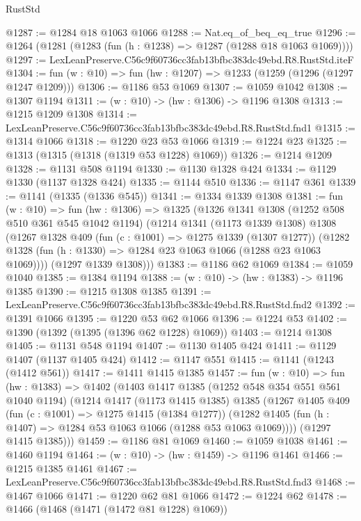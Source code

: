 \begin{lexlean}{RustStd}
\begin{coremodule}
@1287 := @1284 @18 @1063 @1066
@1288 := Nat.eq_of_beq_eq_true
@1296 := @1264 (@1281 (@1283 (fun (h : @1238) => @1287 (@1288 @18 @1063 @1069))))
@1297 := LexLeanPreserve.C56c9f60736cc3fab13bfbc383dc49ebd.R8.RustStd.iteF
@1304 := fun (w : @10) => fun (hw : @1207) => @1233 (@1259 (@1296 (@1297 @1247 @1209)))
@1306 := @1186 @53 @1069
@1307 := @1059 @1042
@1308 := @1307 @1194
@1311 := (w : @10) -> (hw : @1306) -> @1196 @1308
@1313 := @1215 @1209 @1308
@1314 := LexLeanPreserve.C56c9f60736cc3fab13bfbc383dc49ebd.R8.RustStd.fnd1
@1315 := @1314 @1066
@1318 := @1220 @23 @53 @1066
@1319 := @1224 @23
@1325 := @1313 (@1315 (@1318 (@1319 @53 @1228) @1069))
@1326 := @1214 @1209
@1328 := @1131 @508 @1194
@1330 := @1130 @1328 @424
@1334 := @1129 @1330 (@1137 @1328 @424)
@1335 := @1144 @510
@1336 := @1147 @361
@1339 := @1141 (@1335 (@1336 @545))
@1341 := @1334 @1339 @1308
@1381 := fun (w : @10) =>
  fun (hw : @1306) =>
  @1325
    (@1326
      @1341
      @1308
      (@1252 @508 @510 @361 @545 @1042 @1194)
      (@1214
        @1341
        (@1173 @1339 @1308)
        @1308
        (@1267
          @1328
          @409
          (fun (c : @1001) => @1275 @1339 (@1307 @1277))
          (@1282 @1328 (fun (h : @1330) => @1284 @23 @1063 @1066 (@1288 @23 @1063 @1069))))
        (@1297 @1339 @1308)))
@1383 := @1186 @62 @1069
@1384 := @1059 @1040
@1385 := @1384 @1194
@1388 := (w : @10) -> (hw : @1383) -> @1196 @1385
@1390 := @1215 @1308 @1385
@1391 := LexLeanPreserve.C56c9f60736cc3fab13bfbc383dc49ebd.R8.RustStd.fnd2
@1392 := @1391 @1066
@1395 := @1220 @53 @62 @1066
@1396 := @1224 @53
@1402 := @1390 (@1392 (@1395 (@1396 @62 @1228) @1069))
@1403 := @1214 @1308
@1405 := @1131 @548 @1194
@1407 := @1130 @1405 @424
@1411 := @1129 @1407 (@1137 @1405 @424)
@1412 := @1147 @551
@1415 := @1141 (@1243 (@1412 @561))
@1417 := @1411 @1415 @1385
@1457 := fun (w : @10) =>
  fun (hw : @1383) =>
  @1402
    (@1403
      @1417
      @1385
      (@1252 @548 @354 @551 @561 @1040 @1194)
      (@1214
        @1417
        (@1173 @1415 @1385)
        @1385
        (@1267
          @1405
          @409
          (fun (c : @1001) => @1275 @1415 (@1384 @1277))
          (@1282 @1405 (fun (h : @1407) => @1284 @53 @1063 @1066 (@1288 @53 @1063 @1069))))
        (@1297 @1415 @1385)))
@1459 := @1186 @81 @1069
@1460 := @1059 @1038
@1461 := @1460 @1194
@1464 := (w : @10) -> (hw : @1459) -> @1196 @1461
@1466 := @1215 @1385 @1461
@1467 := LexLeanPreserve.C56c9f60736cc3fab13bfbc383dc49ebd.R8.RustStd.fnd3
@1468 := @1467 @1066
@1471 := @1220 @62 @81 @1066
@1472 := @1224 @62
@1478 := @1466 (@1468 (@1471 (@1472 @81 @1228) @1069))

\end{coremodule}
\end{lexlean}
